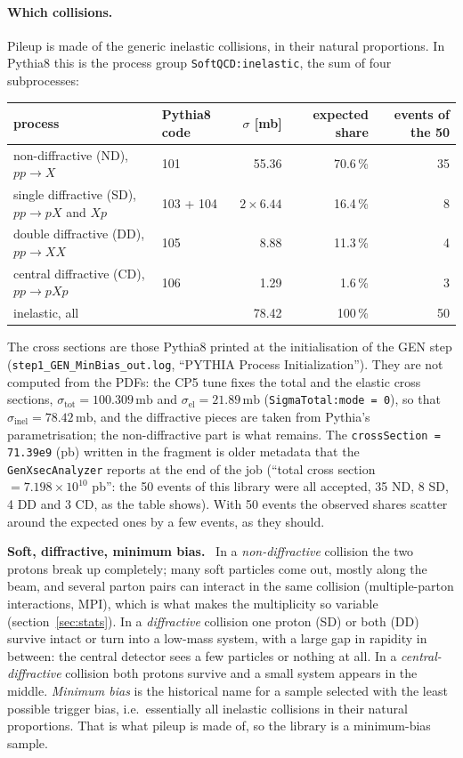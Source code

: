 \documentclass[11pt,a4paper]{article}
\newcommand{\code}[1]{\texttt{#1}}
\newcommand{\mb}{\,\mathrm{mb}}
\newcommand{\sigin}{\ensuremath{\sigma_{\mathrm{inel}}}}
\newenvironment{plainwords}[1][In plain words]{%
  \par\medskip\noindent\setlength{\fboxsep}{6pt}\setlength{\fboxrule}{0.6pt}%
  \begin{lrbox}{\plainbox}\begin{minipage}{\dimexpr\textwidth-2\fboxsep-2\fboxrule\relax}\small
  \textbf{\textcolor{plainrule}{#1.}}\ \ignorespaces}{%
  \end{minipage}\end{lrbox}\noindent\fcolorbox{plainrule}{plainbg}{\usebox{\plainbox}}\par\medskip}
\begin{document}
\paragraph{Which collisions.} Pileup is made of the generic inelastic collisions, in their natural
proportions. In Pythia8 this is the process group \code{SoftQCD:inelastic}, the sum of four subprocesses:
\begin{center}\small
\begin{tabular}{llrrr}
\toprule
process & Pythia8 code & $\sigma$ [mb] & expected share & events of the 50 \\
\midrule
non-diffractive (ND), $pp\to X$ & 101 & 55.36 & 70.6\,\% & 35 \\
single diffractive (SD), $pp\to pX$ and $Xp$ & 103 + 104 & $2\times6.44$ & 16.4\,\% & 8 \\
double diffractive (DD), $pp\to XX$ & 105 & 8.88 & 11.3\,\% & 4 \\
central diffractive (CD), $pp\to pXp$ & 106 & 1.29 & 1.6\,\% & 3 \\
\midrule
inelastic, all & & 78.42 & 100\,\% & 50 \\
\bottomrule
\end{tabular}
\end{center}
{\sloppy The cross sections are those Pythia8 printed at the initialisation of the GEN step
(\code{step1\_GEN\_MinBias\_out.log}, ``PYTHIA Process Initialization''). They are not computed from the
PDFs: the CP5 tune fixes the total and the elastic cross sections, $\sigma_{\mathrm{tot}} = 100.309\mb$ and
$\sigma_{\mathrm{el}} = 21.89\mb$ (\code{SigmaTotal:mode = 0}), so that $\sigin = 78.42\mb$, and the
diffractive pieces are taken from Pythia's parametrisation; the non-diffractive part is what remains. The
\code{crossSection = 71.39e9} (pb) written in the fragment is older metadata that the \code{GenXsecAnalyzer}
reports at the end of the job (``total cross section $= 7.198\times10^{10}$ pb'': the 50 events of this
library were all accepted, 35 ND, 8 SD, 4 DD and 3 CD, as the table shows). With 50 events the observed
shares scatter around the expected ones by a few events, as they should.\par}

\begin{plainwords}[Soft, diffractive, minimum bias]
In a \emph{non-diffractive} collision the two protons break up completely; many soft particles come out,
mostly along the beam, and several parton pairs can interact in the same collision (multiple-parton
interactions, MPI), which is what makes the multiplicity so variable (section~\ref{sec:stats}). In a
\emph{diffractive} collision one proton (SD) or both (DD) survive intact or turn into a low-mass system, with
a large gap in rapidity in between: the central detector sees a few particles or nothing at all. In a
\emph{central-diffractive} collision both protons survive and a small system appears in the middle.
\emph{Minimum bias} is the historical name for a sample selected with the least possible trigger bias, i.e.\
essentially all inelastic collisions in their natural proportions. That is what pileup is made of, so the
library is a minimum-bias sample.
\end{plainwords}
\end{document}
